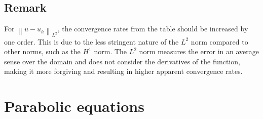 \documentclass[11pt]{book}
\begin{document}
\section*{Remark}
For $\left\|u-u_{h}\right\|_{L^{2}}$, the convergence rates from the table should be increased by one order. This is due to the less stringent nature of the $L^2$ norm compared to other norms, such as the $H^1$ norm. The $L^2$ norm measures the error in an average sense over the domain and does not consider the derivatives of the function, making it more forgiving and resulting in higher apparent convergence rates.


\chapter{Parabolic equations}
\end{document}
